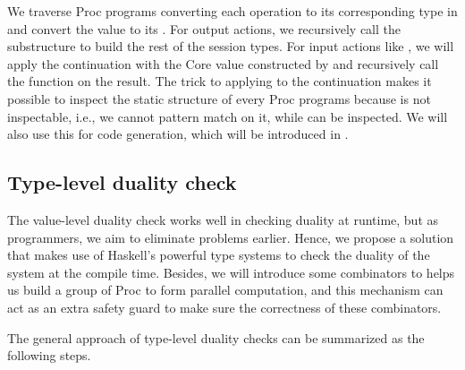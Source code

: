 We traverse Proc programs converting each operation to its corresponding type in  and convert the value to its . For output actions, we recursively call the substructure to build the rest of the session types. For input actions like , we will apply the continuation with the Core value constructed by  and recursively call the function on the result. The trick to applying  to the continuation makes it possible to inspect the static structure of every Proc programs because  is not inspectable, i.e., we cannot pattern match on it, while  can be inspected. We will also use this for code generation, which will be introduced in .
\subsection{Type-level duality check} %
The value-level duality check works well in checking duality at runtime, but as programmers, we aim to eliminate problems earlier. Hence, we propose a solution that makes use of Haskell's powerful type systems to check the duality of the system at the compile time. Besides, we will introduce some combinators to helps us build a group of Proc to form parallel computation, and this mechanism can act as an extra safety guard to make sure the correctness of these combinators.

The general approach of type-level duality checks can be summarized as the following steps.


